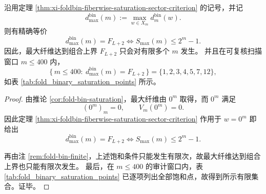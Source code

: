 \begin{corollary}[最大纤维饱和的精确等价条件与仅有限次发生]\label{cor:xi-foldbin-maxfiber-saturation-finite-occurrence}
沿用定理 \ref{thm:xi-foldbin-fiberwise-saturation-sector-criterion} 的记号，并记
\[
d_{\max}^{\mathrm{bin}}(m):=
\max_{w\in X_m}d_m^{\mathrm{bin}}(w).
\]
则有精确等价
\[
d_{\max}^{\mathrm{bin}}(m)=F_{L+2}
\iff
S_{\max}(m)\le 2^m-1.
\]
因此，最大纤维达到组合上界 \(F_{L+2}\) 只会对有限多个 \(m\) 发生。
并且在可复核扫描窗口 \(m\le 400\) 内，
\[
\{\,m\le 400:\ d_{\max}^{\mathrm{bin}}(m)=F_{L+2}\,\}
=
\{1,2,3,4,5,7,12\},
\]
如表 \ref{tab:fold_binary_saturation_points} 所示。
\end{corollary}
\begin{proof}
由推论 \ref{cor:fold-bin-saturation}，最大纤维由 \(0^m\) 取得，而 \(0^m\) 满足
\[
(0^m)_m=0,
\qquad
V_m(0^m)=0.
\]
因此定理 \ref{thm:xi-foldbin-fiberwise-saturation-sector-criterion} 作用于 \(w=0^m\) 即给出
\[
d_{\max}^{\mathrm{bin}}(m)=F_{L+2}
\iff
S_{\max}(m)\le 2^m-1.
\]

再由注 \ref{rem:fold-bin-finite}，上述饱和条件只能发生有限次，故最大纤维达到组合上界也只能有限次发生。
最后，在 \(m\le 400\) 的审计窗口内，表 \ref{tab:fold_binary_saturation_points} 已逐项列出全部饱和点，故得到所示有限集合。证毕。
\end{proof}

\endinput
